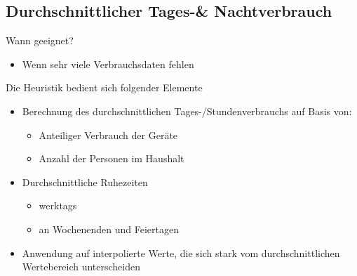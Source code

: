 \subsection{Durchschnittlicher Tages-\& Nachtverbrauch}
\begin{frame}{\insertsubsectionhead}
\begin{block}{Wann geeignet?}
\begin{itemize}
\item Wenn sehr viele Verbrauchsdaten fehlen
\end{itemize}
\end{block}
\begin{block}{Die Heuristik bedient sich folgender Elemente}
\begin{itemize}
\item Berechnung des durchschnittlichen Tages-/Stundenverbrauchs auf Basis von:
\begin{itemize}
\item Anteiliger Verbrauch der Geräte
\item Anzahl der Personen im Haushalt
\end{itemize}
\item Durchschnittliche Ruhezeiten
\begin{itemize}
\item werktags
\item an Wochenenden und Feiertagen
\end{itemize}
\item Anwendung auf interpolierte Werte, die sich stark vom durchschnittlichen Wertebereich unterscheiden
\end{itemize}
\end{block}
\end{frame}

